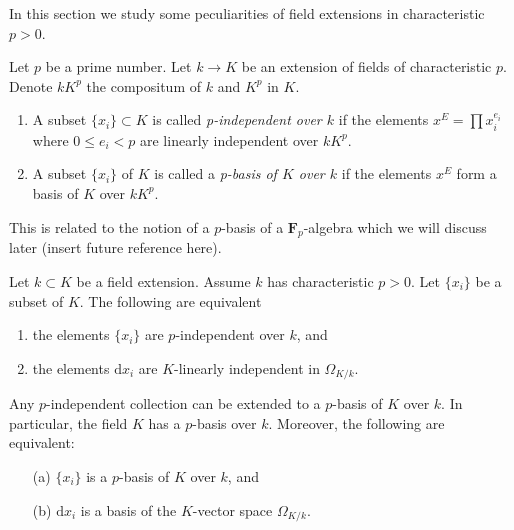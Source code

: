 \noindent
In this section we study some peculiarities of field extensions in
characteristic $p > 0$.

\begin{definition}
\label{definition-p-basis}
Let $p$ be a prime number. Let $k \to K$ be an extension of fields
of characteristic $p$. Denote $kK^p$ the compositum of $k$ and $K^p$
in $K$.
\begin{enumerate}
\item A subset $\{x_i\} \subset K$ is called {\it p-independent
over $k$} if the elements $x^E = \prod x_i^{e_i}$ where
$0 \leq e_i < p$ are linearly independent over $kK^p$.
\item A subset $\{x_i\}$ of $K$ is called a
{\it p-basis of $K$ over $k$} if the elements
$x^E$ form a basis of $K$ over $kK^p$.
\end{enumerate}
\end{definition}

\noindent
This is related to the notion of a $p$-basis of a $\mathbf{F}_p$-algebra
which we will discuss later (insert future reference here).

\begin{lemma}
\label{lemma-p-basis}
Let $k \subset K$ be a field extension. Assume $k$ has characteristic
$p > 0$. Let $\{x_i\}$ be a subset of $K$. The following are equivalent
\begin{enumerate}
\item the elements $\{x_i\}$ are $p$-independent over $k$, and
\item the elements $\text{d}x_i$ are $K$-linearly independent
in $\Omega_{K/k}$.
\end{enumerate}
Any $p$-independent collection can be extended to a $p$-basis of $K$ over $k$.
In particular, the field $K$ has a $p$-basis over $k$.
Moreover, the following are equivalent:
\begin{enumerate}
\item[(a)] $\{x_i\}$ is a $p$-basis of $K$ over $k$, and
\item[(b)] $\text{d}x_i$ is a basis of the $K$-vector space $\Omega_{K/k}$.
\end{enumerate}
\end{lemma}

